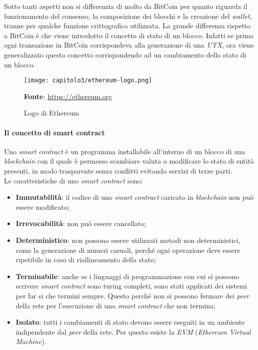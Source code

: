 Sotto tanti aspetti non si differenzia di molto da BitCoin per quanto riguarda il funzionamento del consenso, la composizione dei blocchi e la creazione del \textit{wallet}, tranne per qualche funzione crittografica utilizzata. La grande differenza rispetto a BitCoin è che viene introdotto il concetto di stato di un blocco. Infatti se prima ogni transazione in BitCoin corrispondeva alla generazione di una \textit{UTX}, ora viene generalizzato questo concetto corrispondendo ad un cambiamento dello stato di un blocco.

\begin{figure}[h!]
  \centering
  \texttt{[image: capitolo3/ethereum-logo.png]}
  \caption{Logo di Ethereum}
  \textbf{Fonte}: \href{https://ethereum.org/it}{https://ethereum.org}
\end{figure}

\paragraph{Il concetto di smart contract} \label{par:ethereum.smart-contract}
Uno \textit{smart contract} è un programma installabile all'interno di un blocco di una \textit{blockchain} con il quale è permesso scambiare valuta o modificare lo stato di entità presenti, in modo trasparente senza conflitti evitando servizi di terze parti. \\

\noindent Le caratteristiche di uno \textit{smart contract} sono:
\begin{itemize}
  \item \textbf{Immutabilità}: il codice di uno \textit{smart contract} caricato in \textit{blockchain} non può essere modificato;
  \item \textbf{Irrevocabilità}: non può essere cancellato;
  \item \textbf{Deterministico}: non possono essere utilizzati metodi non deterministici, come la generazione di numeri casuali, perché ogni operazione deve essere ripetibile in caso di riallineamento della stato;
  \item \textbf{Terminabile}: anche se i linguaggi di programmazione con cui si possono scrivere \textit{smart contract} sono \gls{turing completi}, sono stati applicati dei sistemi per far si che termini sempre. Questo perché non si possono fermare dei \textit{peer} della rete per l'esecuzione di uno \textit{smart contract} che non termina;
  \item \textbf{Isolato}: tutti i cambiamenti di stato devono essere eseguiti in un ambiente indipendente dal \textit{peer} della rete. Per questo esiste la \textit{EVM} (\textit{Ethereum Virtual Machine}).
\end{itemize}

